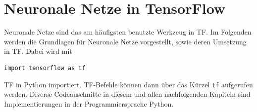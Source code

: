 ﻿\chapter{Neuronale Netze in TensorFlow}
Neuronale Netze sind das am h\"aufigsten benutzte Werkzeug in \gls{TF}. Im Folgenden werden die Grundlagen f\"ur Neuronale Netze vorgestellt, sowie deren Umsetzung in \gls{TF}. Dabei wird mit \cite{cookbook}
\vspace{0.3cm}
\begin{lstlisting}
import tensorflow as tf
\end{lstlisting} \gls{TF} in Python importiert. \gls{TF}-Befehle können dann über das Kürzel \lstinline$tf$ aufgerufen werden. Diverse Codeauschnitte in diesem und allen nachfolgenden Kapiteln sind Implementierungen in der Programmiersprache Python.



